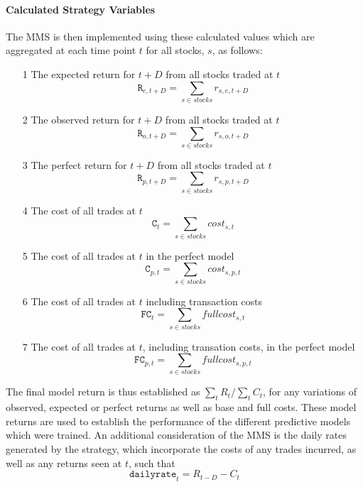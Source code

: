 \documentclass[a4paper,latin]{paper}
\begin{document}
\hfill\break

\paragraph{Calculated Strategy Variables} The MMS  is then implemented using these calculated values which are aggregated at each time point $t$ for all stocks, $s$, as follows:

\begin{itemize}
	\item [1] The expected return for $t+D$ from all stocks traded at $t$
					\begin{equation}
					\texttt{R}_{e, {t+D}} = \sum_{s \in stocks} r_{s, e, {t+D}}
					\end{equation}
	\item [2] The observed return for $t+D$ from all stocks traded at $t$
					\begin{equation}
					\texttt{R}_{o, {t+D}} = \sum_{s \in stocks} r_{s, o, {t+D}}
					\end{equation}
	\item [3] The perfect return for $t+D$ from all stocks traded at $t$
					\begin{equation}
					\texttt{R}_{p, {t+D}} = \sum_{s \in stocks} r_{s, p, {t+D}}
					\end{equation}
	\item [4] The cost of all trades at $t$
					\begin{equation}
					\texttt{C}_t = \sum_{s \in stocks} cost_{s,t}
					\end{equation}
	\item [5] The cost of all trades at $t$ in the perfect model
					\begin{equation}
					\texttt{C}_{p,t} = \sum_{s \in stocks} cost_{s, p ,t}
					\end{equation}
	\item [6] The cost of all trades at $t$ including transaction costs
					\begin{equation}
					\texttt{FC}_t = \sum_{s \in stocks} fullcost_{s,t}
					\end{equation}
	\item [7] The cost of all trades at $t$, including transation costs, in the perfect model	
					\begin{equation}
					\texttt{FC}_{p,t} = \sum_{s \in stocks} fullcost_{s, p ,t}
					\end{equation}	
\end{itemize}
\hfill\break
The final model return is thus established as $\sum_t{R_t} / \sum_t{C_t} $, for any variations of observed, expected or perfect returns as well as base and full costs. These model returns are used to establish the performance of the different predictive models which were trained.\newline
\hfill\break
An additional consideration of the MMS is the daily rates generated by the strategy, which incorporate the costs of any trades incurred, as well as any returns seen at $t$, such that 
\begin{equation}
\texttt{dailyrate}_t = R_{t-D} - C_t
\end{equation}
\end{document}

